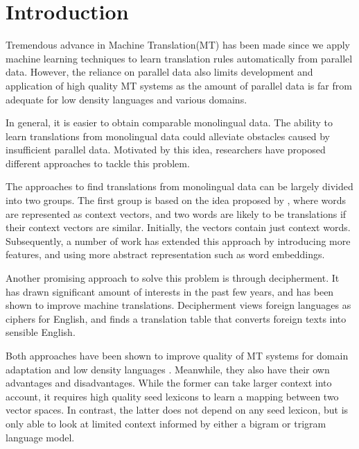\section{Introduction}
Tremendous advance in Machine Translation(MT) has been made since we apply machine learning techniques to learn translation rules automatically from parallel data. However, the reliance on parallel data also limits development and application of high quality MT systems as the amount of parallel data is far from adequate for low density languages and various domains.

In general, it is easier to obtain comparable monolingual data. The ability to learn translations from monolingual data could alleviate obstacles caused by insufficient parallel data. Motivated by this idea, researchers have proposed different approaches to tackle this problem. 

The approaches to find translations from monolingual data can be largely divided into two groups. The first group is based on the idea proposed by , where words are represented as context vectors, and two words are likely to be translations if their context vectors are similar. Initially, the vectors contain just context words. Subsequently, a number of work has extended this approach by introducing more features\cite{haghighi-EtAl:2008:ACLMain,Garera:2009,Bergsma:2011,Daume:2011:DAM:2002736.2002819,irvine-callisonburch:2013,irvine-callisonburch:2013:WMT}, and using more abstract representation such as word embeddings\cite{KlementievCOLING}.

Another promising approach to solve this problem is through decipherment. It has drawn significant amount of interests in the past few years\cite{ravi-knight:2011,Nuhn:2012,dou-knight:2013:EMNLP,ravi:2013}, and has been shown to improve machine translations. Decipherment views foreign languages as ciphers for English, and finds a translation table that converts foreign texts into sensible English. 

Both approaches have been shown to improve quality of MT systems for domain adaptation \cite{Daume:2011:DAM:2002736.2002819,Dou:2012,irvineQuirkDaumeEMNLP13} and low density languages \cite{irvine-callisonburch:2013:WMT,dou-vaswani-knight:2014:EMNLP2014}. Meanwhile, they also have their own advantages and disadvantages. While the former can take larger context into account, it requires high quality seed lexicons to learn a mapping between two vector spaces. In contrast, the latter does not depend on any seed lexicon, but is only able to look at limited context informed by either a bigram or trigram language model.  

